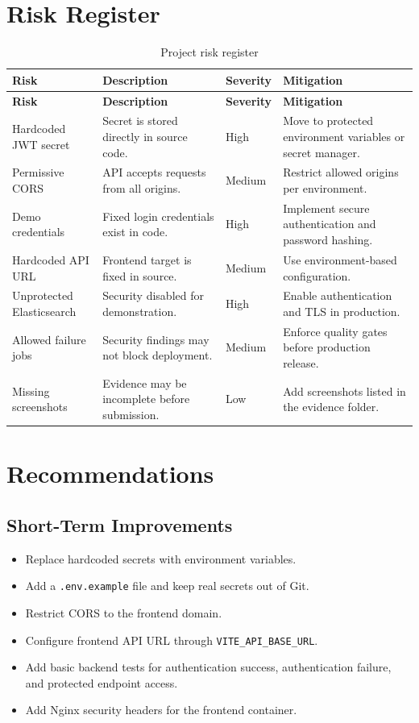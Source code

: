 \documentclass[12pt,a4paper]{report}
\begin{document}
\chapter{Risk Register}

\begin{longtable}{p{3cm}p{4cm}p{3cm}p{5cm}}
\caption{Project risk register} \\
\toprule
\textbf{Risk} & \textbf{Description} & \textbf{Severity} & \textbf{Mitigation} \\
\midrule
\endfirsthead
\toprule
\textbf{Risk} & \textbf{Description} & \textbf{Severity} & \textbf{Mitigation} \\
\midrule
\endhead
Hardcoded JWT secret & Secret is stored directly in source code. & High & Move to protected environment variables or secret manager. \\
Permissive CORS & API accepts requests from all origins. & Medium & Restrict allowed origins per environment. \\
Demo credentials & Fixed login credentials exist in code. & High & Implement secure authentication and password hashing. \\
Hardcoded API URL & Frontend target is fixed in source. & Medium & Use environment-based configuration. \\
Unprotected Elasticsearch & Security disabled for demonstration. & High & Enable authentication and TLS in production. \\
Allowed failure jobs & Security findings may not block deployment. & Medium & Enforce quality gates before production release. \\
Missing screenshots & Evidence may be incomplete before submission. & Low & Add screenshots listed in the evidence folder. \\
\bottomrule
\end{longtable}

\chapter{Recommendations}

\section{Short-Term Improvements}

\begin{itemize}[leftmargin=*]
    \item Replace hardcoded secrets with environment variables.
    \item Add a \texttt{.env.example} file and keep real secrets out of Git.
    \item Restrict CORS to the frontend domain.
    \item Configure frontend API URL through \texttt{VITE\_API\_BASE\_URL}.
    \item Add basic backend tests for authentication success, authentication failure, and protected endpoint access.
    \item Add Nginx security headers for the frontend container.
\end{itemize}
\end{document}

